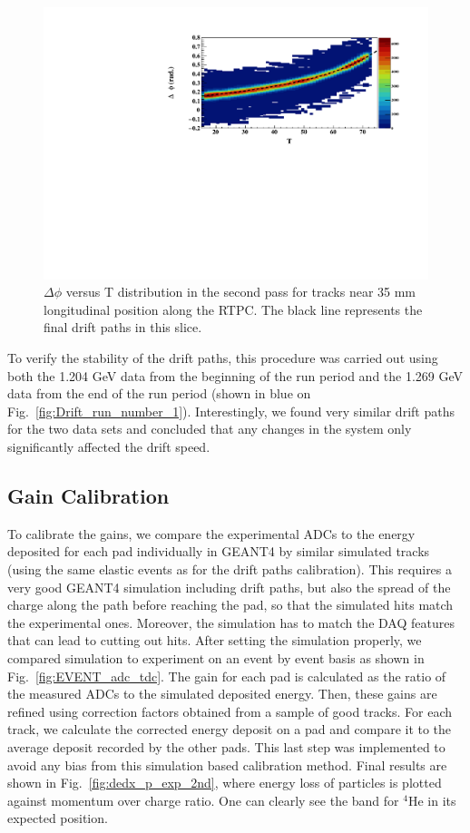 \documentclass[preprint,5p]{elsarticle}
\begin{document}
\begin{figure}[tb]
\centering
\includegraphics[scale=0.42]{fig_2017/FitResult_p2_11.pdf}
\caption{$\Delta \phi$ versus T distribution in the second pass for tracks
near 35 mm longitudinal position along the RTPC. The black line represents 
the final drift paths in this slice.}
\label{fig:DELTA_PHI_TDC}
\end{figure}

To verify the stability of the drift paths, this procedure was carried out 
using both the 1.204 GeV data from the beginning of the run period and the 
1.269 GeV data from the end of the run period (shown in blue on 
Fig.~\ref{fig:Drift_run_number_1}). Interestingly, we found very similar drift paths
for the two data sets and concluded that any changes in the system only
significantly affected the drift speed.

\subsection{Gain Calibration}

To calibrate the gains, we compare the experimental ADCs to the energy deposited 
for each pad individually in GEANT4 by similar simulated tracks (using the 
same elastic events as for the drift 
paths calibration). This requires a very good GEANT4 simulation 
including drift paths, but also the spread of the charge along the path
before reaching the pad, so that the simulated hits match the experimental 
ones. Moreover, the simulation has to match the DAQ features 
that can lead to cutting out hits. After setting the simulation properly, we 
compared simulation to experiment on an event by event basis as shown in 
Fig.~\ref{fig:EVENT_adc_tdc}. The gain for each pad is calculated 
as the ratio of the measured ADCs to the simulated deposited energy.  
Then, these gains are refined using correction factors obtained from a 
sample of good tracks. For each track, we calculate the corrected 
energy deposit on a pad and compare it to the average
deposit recorded by the other pads. This last step was implemented to 
avoid any bias from this simulation based calibration method.
Final results are shown in Fig.~\ref{fig:dedx_p_exp_2nd}, where energy 
loss of particles is plotted against momentum over charge ratio. One can 
clearly see the band for $^4$He in its expected position.
\end{document}
